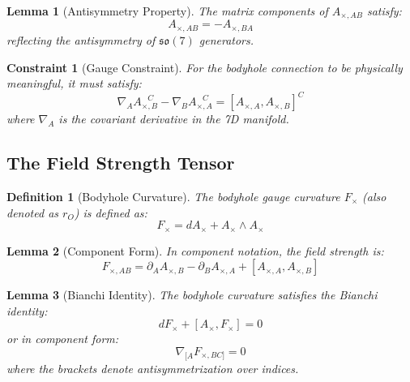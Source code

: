 \documentclass{article}
\newtheorem{lemma}{Lemma}
\newtheorem{definition}{Definition}
\newtheorem{constraint}{Constraint}
\begin{document}
\begin{lemma}[Antisymmetry Property]
The matrix components of $A_{\times,AB}$ satisfy:
\begin{equation}
A_{\times,AB} = -A_{\times,BA}
\end{equation}
reflecting the antisymmetry of $\mathfrak{so}(7)$ generators.
\end{lemma}

\begin{constraint}[Gauge Constraint]
For the bodyhole connection to be physically meaningful, it must satisfy:
\begin{equation}
\nabla_A A_{\times,B}^{\phantom{B}C} - \nabla_B A_{\times,A}^{\phantom{A}C} = [A_{\times,A}, A_{\times,B}]^C
\end{equation}
where $\nabla_A$ is the covariant derivative in the 7D manifold.
\end{constraint}

\subsection{The Field Strength Tensor}

\begin{definition}[Bodyhole Curvature]
The bodyhole gauge curvature $F_{\times}$ (also denoted as $r_O$) is defined as:
\begin{equation}
F_{\times} = dA_{\times} + A_{\times} \wedge A_{\times}
\end{equation}
\end{definition}

\begin{lemma}[Component Form]
In component notation, the field strength is:
\begin{equation}
F_{\times,AB} = \partial_A A_{\times,B} - \partial_B A_{\times,A} + [A_{\times,A}, A_{\times,B}]
\end{equation}
\end{lemma}

\begin{lemma}[Bianchi Identity]
The bodyhole curvature satisfies the Bianchi identity:
\begin{equation}
dF_{\times} + [A_{\times}, F_{\times}] = 0
\end{equation}
or in component form:
\begin{equation}
\nabla_{[A} F_{\times,BC]} = 0
\end{equation}
where the brackets denote antisymmetrization over indices.
\end{lemma}
\end{document}
